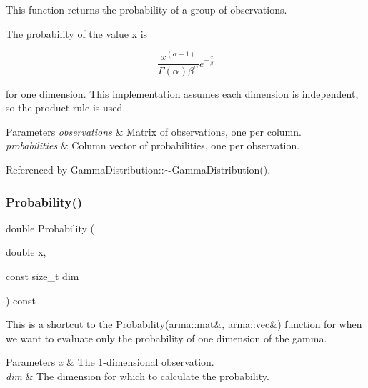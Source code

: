 This function returns the probability of a group of observations. 

The probability of the value x is

\[ \frac{x^{(\alpha - 1)}}{\Gamma(\alpha) \beta^\alpha} e^{-\frac{x}{\beta}} \]

for one dimension. This implementation assumes each dimension is independent, so the product rule is used.


\begin{DoxyParams}{Parameters}
{\em observations} & Matrix of observations, one per column. \\
\hline
{\em probabilities} & Column vector of probabilities, one per observation. \\
\hline
\end{DoxyParams}


Referenced by Gamma\+Distribution\+::$\sim$\+Gamma\+Distribution().

\mbox{\label{classmlpack_1_1distribution_1_1GammaDistribution_a6f2d582a78ea604f0c682f81932ad539}} 
\subsubsection{Probability()\hspace{0.1cm}{\footnotesize\ttfamily [2/2]}}
{\footnotesize\ttfamily double Probability (\begin{DoxyParamCaption}\item[{double}]{x,  }\item[{const size\+\_\+t}]{dim }\end{DoxyParamCaption}) const}



This is a shortcut to the Probability(arma\+::mat\&, arma\+::vec\&) function for when we want to evaluate only the probability of one dimension of the gamma. 


\begin{DoxyParams}{Parameters}
{\em x} & The 1-\/dimensional observation. \\
\hline
{\em dim} & The dimension for which to calculate the probability. \\
\hline
\end{DoxyParams}
\mbox{\label{classmlpack_1_1distribution_1_1GammaDistribution_a2c6f8d5bb4eacf7de767d2172b320756}} 
